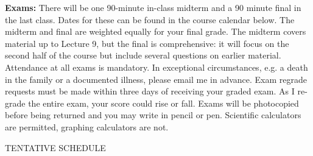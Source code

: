 \documentclass[11pt, letterpaper]{article}
\begin{document}
\noindent \textbf{Exams:} There will be one 90-minute in-class midterm and a 90 minute final in the last class. Dates
for these can be found in the course calendar below. The midterm and final are weighted equally
for your final grade. The midterm covers material up to Lecture 9, but the final is comprehensive:
it will focus on the second half of the course but include several questions on earlier material.
Attendance at
all exams is mandatory. In exceptional circumstances, e.g. a death in the family or a documented illness, please email me in advance. Exam regrade
requests must be made within three days of receiving your graded exam. As I re-grade the entire
exam, your score could rise or fall. Exams will be photocopied before being returned and you may
write in pencil or pen. Scientific calculators are permitted, graphing calculators are not.

\medskip
\bigskip
\begin{center}
\small
TENTATIVE SCHEDULE
\end{center}
\end{document}
